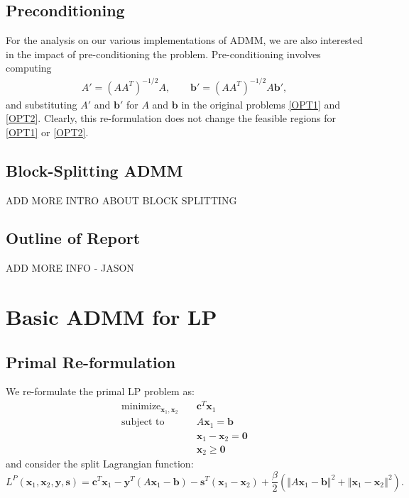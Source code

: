 \documentclass{article}
\begin{document}
\vspace{0.1in}
\subsection*{Preconditioning}
For the analysis on our various implementations of ADMM, we are also interested in the impact of pre-conditioning the problem. Pre-conditioning involves computing 
\begin{align}
A' = (AA^T )^{-1/2}A , \quad \quad \mathbf{b}' =(AA^T )^{-1/2}A\mathbf{b}',
\end{align}
and substituting $A'$ and $\mathbf{b}'$ for $A$ and $\mathbf{b}$ in the original problems \eqref{OPT1} and \eqref{OPT2}. Clearly, this re-formulation does not change the feasible regions for  \eqref{OPT1} or \eqref{OPT2}. 

\vspace{0.1in}
\vspace{0.1in}
\subsection*{Block-Splitting ADMM}
{\color{red} ADD MORE INTRO ABOUT BLOCK SPLITTING}

\vspace{0.1in}
\vspace{0.1in}
\subsection*{Outline of Report}
{\color{red} ADD MORE INFO - JASON}

\vspace{0.5in}
\section{Basic ADMM for LP}
\vspace{0.1in}
\subsection*{Primal Re-formulation}
We re-formulate the primal LP problem as:
\begin{align}
\text{minimize}_{ \mathbf{x}_{1}, \mathbf{x}_{2}} &\quad \mathbf{c}^T\mathbf{x}_1 \tag{OPT3}\label{OPT3} \\
\text{subject to  \ \  } &\quad  A \mathbf{x}_{1} = \mathbf{b}  \nonumber \\
&\quad \mathbf{x}_{1}  - \mathbf{x}_{2} = \mathbf{0}  \nonumber \\
&\quad \mathbf{x}_{2} \geq \mathbf{0} \nonumber 
\end{align}
and consider the split Lagrangian function:
\[
L^{P}(\mathbf{x}_{1},\mathbf{x}_{2},\mathbf{y} ,\mathbf{s})=\mathbf{c}^{T}\mathbf{x}_{1}-\mathbf{y}^{T}\left(A\mathbf{x}_{1}-\mathbf{b}\right)-\mathbf{s}^{T}\left(\mathbf{x}_{1}-\mathbf{x}_{2}\right)+\frac{\beta}{2}\left(\left\Vert A\mathbf{x}_{1}-\mathbf{b}\right\Vert ^{2}+\left\Vert \mathbf{x}_{1}-\mathbf{x}_{2}\right\Vert ^{2}\right).
\]
\end{document}
